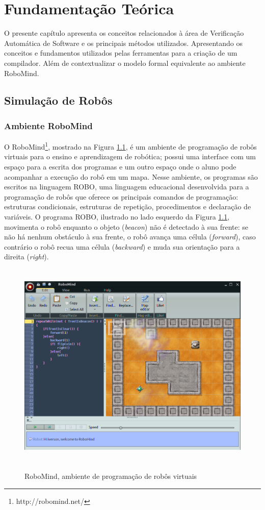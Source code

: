 \chapter{Fundamentação Teórica}
\label{chap:cap2}
O presente capítulo apresenta os conceitos relacionados à área de Verificação Automática de Software e os principais métodos utilizados. Apresentando os conceitos e fundamentos utilizados pelas ferramentas para a criação de um compilador. Além de contextualizar o modelo formal equivalente ao ambiente RoboMind.

\section{Simulação de Robôs}


\subsection{Ambiente RoboMind}
O RoboMind\footnote[2]{http://robomind.net/}, mostrado na Figura \ref{fig:robomind}, é um ambiente de programação de robôs virtuais para o ensino e aprendizagem de robótica; possui uma interface com um espaço para a escrita dos programas e um outro espaço onde o aluno pode acompanhar a execução do robô em um mapa. Nesse ambiente, os programas são escritos na linguagem ROBO, uma linguagem educacional desenvolvida para a programação de robôs que oferece os principais comandos de programação: estruturas condicionais, estruturas de repetição, procedimentos e declaração de variáveis. O programa ROBO, ilustrado no lado esquerdo da Figura \ref{fig:robomind}, movimenta o robô enquanto o objeto (\textit{beacon}) não é detectado à sua frente: se não há nenhum obstáculo à sua frente, o robô avança uma célula (\textit{forward}), caso contrário o robô recua uma célula (\textit{backward}) e muda sua orientação para a direita (\textit{right}).

\begin{figure}[h]
\centering
\caption{RoboMind, ambiente de programação de robôs virtuais}
\includegraphics[height=10cm]{figuras/robomind_ide3.png}
\label{fig:robomind}
\end{figure}

